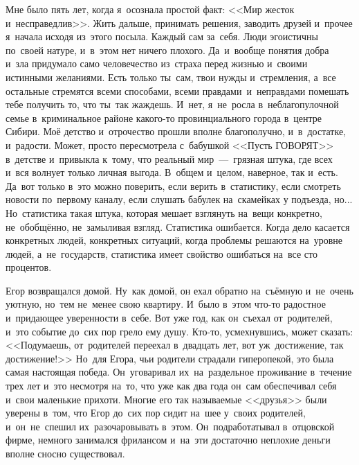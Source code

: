 

Мне было пять лет, когда я~осознала простой факт: <<Мир жесток и~несправедлив>>.
Жить дальше, принимать решения, заводить друзей и~прочее я~начала исходя из~этого посыла.
Каждый сам за~себя.
Люди эгоистичны по~своей натуре, и~в~этом нет ничего плохого.
Да~и~вообще понятия добра и~зла придумало само человечество из~страха перед жизнью и~своими истинными желаниями.
Есть только ты~сам, твои нужды и~стремления, а~все остальные стремятся всеми способами, всеми правдами~и~неправдами помешать тебе получить то, что ты~так жаждешь.
И~нет, я~не~росла в~неблагопулочной семье в~криминальное районе какого-то провинциального города в~центре Сибири.
Моё детство и~отрочество прошли вполне благополучно, и~в~достатке, и~радости.
Может, просто пересмотрела с~бабушкой <<Пусть ГОВОРЯТ>> в~детстве и~привыкла к~тому, что реальный мир~---~грязная штука, где всех и~вся волнует только личная выгода.
В~общем и~целом, наверное, так и~есть.
Да~вот только в~это можно поверить, если верить в~статистику, если смотреть новости по~первому каналу, если слушать бабулек на~скамейках у подъезда, но... Но~статистика такая штука, которая мешает взглянуть на~вещи конкретно, не~обобщённо, не~замыливая взгляд.
Статистика ошибается.
Когда дело касается конкретных людей, конкретных ситуаций, когда проблемы решаются на~уровне людей, а~не~государств, статистика имеет свойство ошибаться на~все сто процентов.
 
\vspace{7mm}

Егор возвращался домой.
Ну~как домой, он ехал обратно на~съёмную и~не~очень уютную, но~тем не~менее свою квартиру.
И~было в~этом что-то радостное и~придающее уверенности в~себе.
Вот уже год, как он~съехал от~родителей, и~это событие до~сих пор грело ему душу.
Кто-то, усмехнувшись, может сказать: <<Подумаешь, от~родителей переехал в~двадцать лет, вот уж~достижение, так достижение!>> Но~для Егора, чьи родители страдали гиперопекой, это была самая настоящая победа.
Он~уговаривал их~на~раздельное проживание в~течение трех лет и~это несмотря на~то, что уже как два года он~сам обеспечивал себя и~свои маленькие прихоти.
Многие его так называемые <<друзья>> были уверены в~том, что Егор до~сих пор сидит на~шее у~своих родителей, и~он~не~спешил их~разочаровывать в~этом.
Он~подработатывал в~отцовской фирме, немного занимался фрилансом и~на~эти достаточно неплохие деньги вполне сносно существовал.


